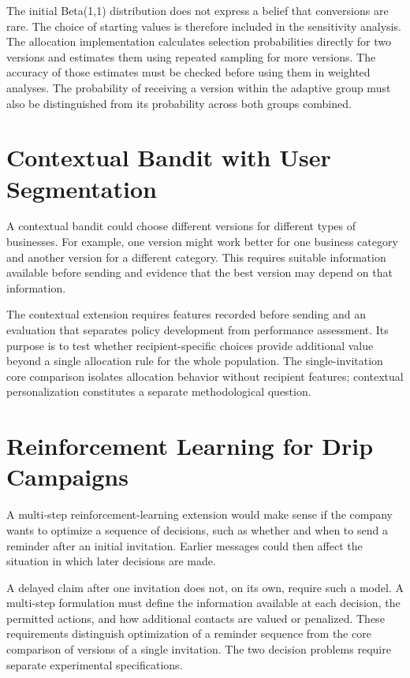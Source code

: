The initial Beta(1,1) distribution does not express a belief that conversions are rare. The choice of starting values is therefore included in the sensitivity analysis. The allocation implementation calculates selection probabilities directly for two versions and estimates them using repeated sampling for more versions. The accuracy of those estimates must be checked before using them in weighted analyses. The probability of receiving a version within the adaptive group must also be distinguished from its probability across both groups combined.

\section{Contextual Bandit with User Segmentation}
\label{sec:method_contextual}

A contextual bandit could choose different versions for different types of businesses. For example, one version might work better for one business category and another version for a different category. This requires suitable information available before sending and evidence that the best version may depend on that information.

The contextual extension requires features recorded before sending and an evaluation that separates policy development from performance assessment. Its purpose is to test whether recipient-specific choices provide additional value beyond a single allocation rule for the whole population. The single-invitation core comparison isolates allocation behavior without recipient features; contextual personalization constitutes a separate methodological question.

\section{Reinforcement Learning for Drip Campaigns}
\label{sec:method_rl}

A multi-step reinforcement-learning extension would make sense if the company wants to optimize a sequence of decisions, such as whether and when to send a reminder after an initial invitation. Earlier messages could then affect the situation in which later decisions are made.

A delayed claim after one invitation does not, on its own, require such a model. A multi-step formulation must define the information available at each decision, the permitted actions, and how additional contacts are valued or penalized. These requirements distinguish optimization of a reminder sequence from the core comparison of versions of a single invitation. The two decision problems require separate experimental specifications.

